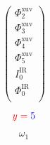 \documentclass{article}
\begin{document}
\begin{equation*}
	\begin{pmatrix}
		\Phi^{\textrm{xuv}}_{2}\\
		\Phi^{\textrm{xuv}}_{3}\\
		\Phi^{\textrm{xuv}}_{4}\\
		\Phi^{\textrm{xuv}}_{5}\\
		I_0^{\textrm{IR}}\\
		\Phi_0^{\textrm{IR}}\\
	\end{pmatrix}
\end{equation*}

\begin{equation*}
  \color{red}
  y = \color{blue}5
\end{equation*}

\begin{equation*}
	\omega_1
\end{equation*}
\end{document}
